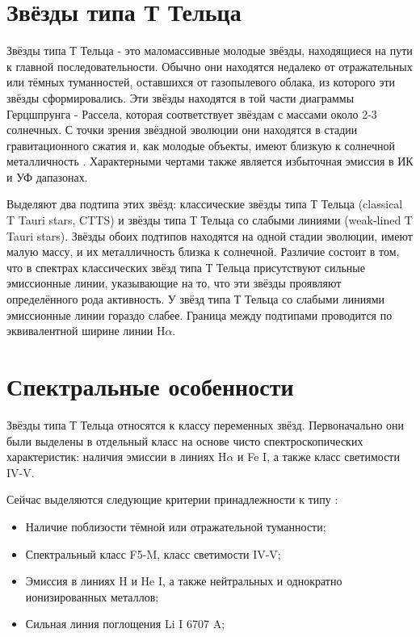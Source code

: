 
\section{Звёзды типа Т Тельца}
Звёзды типа Т Тельца - это маломассивные молодые звёзды, находящиеся на пути к главной последовательности. Обычно они находятся недалеко от отражательных или тёмных туманностей, оставшихся от газопылевого облака, из которого эти звёзды сформировались. Эти звёзды находятся в той части диаграммы Герцшпрунга - Рассела, которая соответствует звёздам с массами около 2-3 солнечных. С точки зрения звёздной эволюции они находятся в стадии гравитационного сжатия и, как молодые объекты, имеют близкую к солнечной металличность \cite{dod2013}. Характерными чертами также является избыточная эмиссия в ИК и УФ дапазонах.

Выделяют два подтипа этих звёзд: классические звёзды типа Т Тельца (classical T Tauri stars, CTTS) и звёзды типа Т Тельца со слабыми линиями (weak-lined T Tauri stars). Звёзды обоих подтипов находятся на одной стадии эволюции, имеют малую массу, и их металличность близка к солнечной. Различие состоит в том, что в спектрах классических звёзд типа Т Тельца присутствуют сильные эмиссионные линии, указывающие на то, что эти звёзды проявляют определённого рода активность. У звёзд типа Т Тельца со слабыми линиями эмиссионные линии гораздо слабее. Граница между подтипами проводится по эквивалентной ширине линии H$\alpha$. 


\section{Спектральные особенности}
Звёзды типа Т Тельца относятся к классу переменных звёзд. Первоначально они были выделены в отдельный класс на основе чисто спектроскопических характеристик: наличия эмиссии в линиях H$\alpha$ и Fe I, а также класс светимости IV-V. 

Сейчас выделяются следующие критерии принадлежности к типу \cite{dod2013}:
\begin{itemize}
	\item Наличие поблизости тёмной или отражательной туманности;
	\item	Спектральный класс F5-M, класс светимости IV-V;
	\item	Эмиссия в линиях H и He I, а также нейтральных и однократно ионизированных металлов;
	\item	Сильная линия поглощения Li I 6707 A;
\end{itemize}

